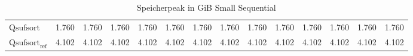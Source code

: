 \begin{table}
{\begin{tabular}{lrrrrrrrrrrrrr}
    $\text{Qsufsort}$ & 1.760 & 1.760 & 1.760 & 1.760 & 1.760 & 1.760 & 1.760 & 1.760 & 1.760 & 1.760 & 1.760 & 1.760 & 1.760 \\
    $\text{Qsufsort}_{\text{ref}}$ & 4.102 & 4.102 & 4.102 & 4.102 & 4.102 & 4.102 & 4.102 & 4.102 & 4.102 & 4.102 & 4.102 & 4.102 & 4.102 \\
\bottomrule
\end{tabular}
}
\caption{Speicherpeak in GiB Small Sequential}
\label{messung:tab:duration-small-seq-none}
\end{table}
